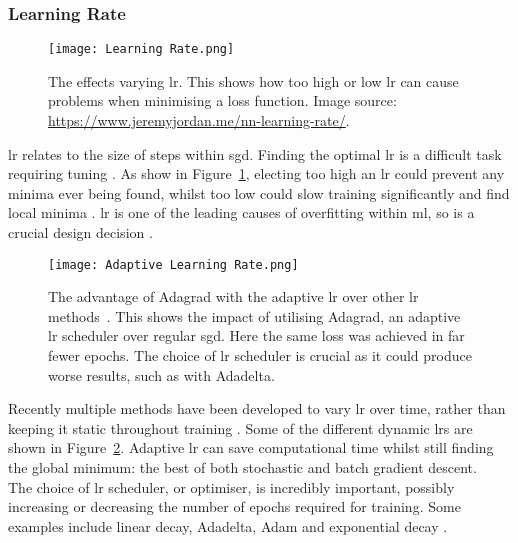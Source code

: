 \subsubsection{Learning Rate}
\begin{figure}
\centering
\texttt{[image: Learning Rate.png]}
\caption[The effects of varying \acrshort{lr}.]{The effects varying \acrshort{lr}. This shows how too high or low \acrshort{lr} can cause problems when minimising a loss function. Image source: \url{https://www.jeremyjordan.me/nn-learning-rate/}.}
\label{fig:Learning Rate}
\end{figure}
\acrfull{lr} relates to the size of steps within \acrshort{sgd}. Finding the optimal \acrshort{lr} is a difficult task requiring tuning \cite{adadelta_adaptive_learning_rate}. As show in Figure~\ref{fig:Learning Rate}, electing too high an \acrshort{lr} could prevent any minima ever being found, whilst too low could slow training significantly and find local minima \cite{adadelta_adaptive_learning_rate}. \acrshort{lr} is one of the leading causes of \gls{overfitting} within \acrshort{ml}, so is a crucial design decision \cite{learning_rate_causes_overfitting}.\\
\begin{figure}
\centering
\texttt{[image: Adaptive Learning Rate.png]}
\caption[The advantage of Adagrad with the adaptive \acrshort{lr} over other \acrshort{lr} methods.]{The advantage of Adagrad with the adaptive \acrshort{lr} over other \acrshort{lr} methods~\cite{adaptive_learning_rate_diagram}. This shows the impact of utilising Adagrad, an adaptive \acrshort{lr} scheduler over regular \acrshort{sgd}. Here the same loss was achieved in far fewer epochs. The choice of \acrshort{lr} scheduler is crucial as it could produce worse results, such as with Adadelta.}
\label{fig:Adaptive Learning Rate}
\end{figure}
Recently multiple methods have been developed to vary \acrshort{lr} over time, rather than keeping it static throughout training \cite{Learning-an-adaptive-learning-rate-schedule}. Some of the different dynamic \acrshort{lr}s are shown in Figure~\ref{fig:Adaptive Learning Rate}. Adaptive \acrshort{lr} can save computational time whilst still finding the global minimum: the best of both stochastic and batch gradient descent.\\
The choice of \acrshort{lr} scheduler, or optimiser, is incredibly important, possibly increasing or decreasing the number of epochs required for training. Some examples include linear decay, Adadelta, Adam and exponential decay \cite{Learning-an-adaptive-learning-rate-schedule}.\\
